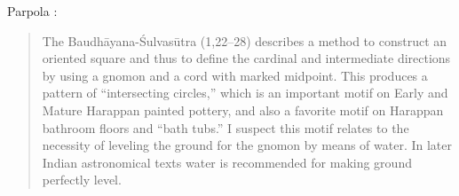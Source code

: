 \documentclass{article}
\begin{document}
Parpola \cite[pp.~195--196]{parpola}:

\begin{quote}
The Baudh\=ayana-\'Sulvas\=utra (1,22--28) describes a method to construct an oriented 
square and thus to define the cardinal and intermediate directions by using a gnomon and 
a cord with marked midpoint. This produces a pattern of ``intersecting circles,'' which is an
important motif on Early and Mature Harappan painted pottery, and also a favorite motif
on Harappan bathroom floors and ``bath tubs.'' I suspect this motif relates to the necessity 
of leveling the ground for the gnomon by means of water. In later Indian astronomical texts
water is recommended for making ground perfectly level.
\end{quote}

\nocite{*}



\end{document}
